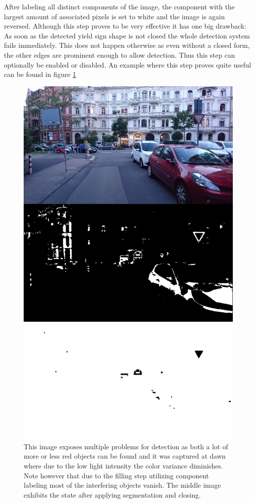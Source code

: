 \documentclass{report}
\begin{document}
After labeling all distinct components of the image, the component
with the largest amount of associated pixels is set to white and the
image is again reversed. Although this step proves to be very
effective it has one big drawback: As soon as the detected yield sign
shape is not closed the whole detection system fails immediately. This
does not happen otherwise as even without a closed form, the other
edges are prominent enough to allow detection. Thus this step can
optionally be enabled or disabled. An example where this step proves
quite useful can be found in figure \ref{img:filling}

\begin{figure}
  \centering
    \includegraphics[width=.7\textwidth, frame]{src/comp/merged}
  \caption{This image exposes multiple problems for detection as both
    a lot of more or less red objects can be found and it was captured
    at dawn where due to the low light intensity the color variance
    diminishes. Note however that due to the filling step utilizing
    component labeling most of the interfering objects vanish. The
    middle image exhibits the state after applying segmentation and
    closing.}
  \label{img:filling}
\end{figure}
\end{document}
